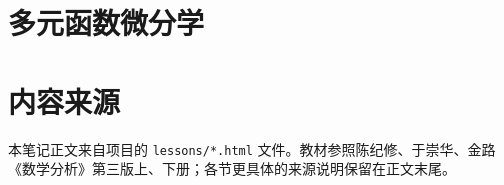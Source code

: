 \documentclass[11pt,openany]{ctexbook}
\begin{document}
\chapter{多元函数微分学}





\backmatter
\chapter*{内容来源}
本笔记正文来自项目的 \texttt{lessons/*.html} 文件。教材参照陈纪修、于崇华、金路《数学分析》第三版上、下册；各节更具体的来源说明保留在正文末尾。
\end{document}

